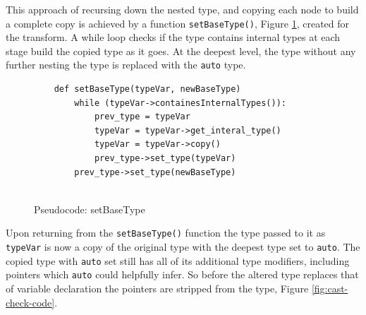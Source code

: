 \documentclass[bsc,frontabs,singlespacing,parskip,deptreport]{infthesis}
\begin{document}
This approach of recursing down the nested type, and copying each node to build a complete copy is achieved by a function \texttt{setBaseType()}, Figure \ref{fig:code-set-type}, created for the transform. A while loop checks if the type contains internal types at each stage build the copied type as it goes. At the deepest level, the type without any further nesting the type is replaced with the \texttt{auto} type. 


\begin{figure}[H]
    \begin{verbatim}
    def setBaseType(typeVar, newBaseType)
        while (typeVar->containesInternalTypes()):
            prev_type = typeVar
            typeVar = typeVar->get_interal_type()
            typeVar = typeVar->copy()
            prev_type->set_type(typeVar)
        prev_type->set_type(newBaseType)    
            
    \end{verbatim}
    \caption{Pseudocode: setBaseType}
    \centering
    \label{fig:code-set-type}
\end{figure}

Upon returning from the \texttt{setBaseType()} function the type passed to it as \texttt{typeVar} is now a copy of the original type with the deepest type set to \texttt{auto}. The copied type with \texttt{auto} set still has all of its additional type modifiers, including pointers which \texttt{auto} could helpfully infer. So before the altered type replaces that of variable declaration the pointers are stripped from the type, Figure \ref{fig:cast-check-code}. 





    
    
\end{document}
